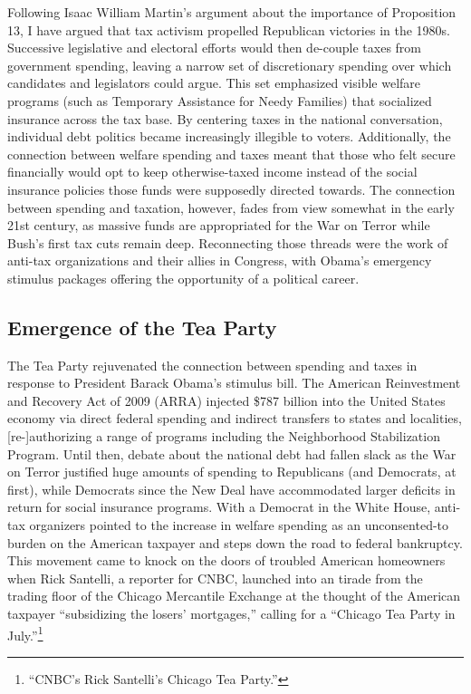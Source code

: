 \documentclass[
]{article}
\let\rmarkdownfootnote\footnote%
\def\footnote{\protect\rmarkdownfootnote}
\begin{document}
Following Isaac William Martin's argument about the importance of
Proposition 13, I have argued that tax activism propelled Republican
victories in the 1980s. Successive legislative and electoral efforts
would then de-couple taxes from government spending, leaving a narrow
set of discretionary spending over which candidates and legislators
could argue. This set emphasized visible welfare programs (such as
Temporary Assistance for Needy Families) that socialized insurance
across the tax base. By centering taxes in the national conversation,
individual debt politics became increasingly illegible to voters.
Additionally, the connection between welfare spending and taxes meant
that those who felt secure financially would opt to keep otherwise-taxed
income instead of the social insurance policies those funds were
supposedly directed towards. The connection between spending and
taxation, however, fades from view somewhat in the early 21st century,
as massive funds are appropriated for the War on Terror while Bush's
first tax cuts remain deep. Reconnecting those threads were the work of
anti-tax organizations and their allies in Congress, with Obama's
emergency stimulus packages offering the opportunity of a political
career.

\hypertarget{emergence-of-the-tea-party}{%
\subsection{Emergence of the Tea
Party}\label{emergence-of-the-tea-party}}

The Tea Party rejuvenated the connection between spending and taxes in
response to President Barack Obama's stimulus bill. The American
Reinvestment and Recovery Act of 2009 (ARRA) injected \$787 billion into
the United States economy via direct federal spending and indirect
transfers to states and localities, {[}re-{]}authorizing a range of
programs including the Neighborhood Stabilization Program. Until then,
debate about the national debt had fallen slack as the War on Terror
justified huge amounts of spending to Republicans (and Democrats, at
first), while Democrats since the New Deal have accommodated larger
deficits in return for social insurance programs. With a Democrat in the
White House, anti-tax organizers pointed to the increase in welfare
spending as an unconsented-to burden on the American taxpayer and steps
down the road to federal bankruptcy. This movement came to knock on the
doors of troubled American homeowners when Rick Santelli, a reporter for
CNBC, launched into an tirade from the trading floor of the Chicago
Mercantile Exchange at the thought of the American taxpayer
``subsidizing the losers' mortgages,'' calling for a ``Chicago Tea Party
in July.''\footnote{``CNBC's Rick Santelli's Chicago Tea Party.''}
\end{document}
